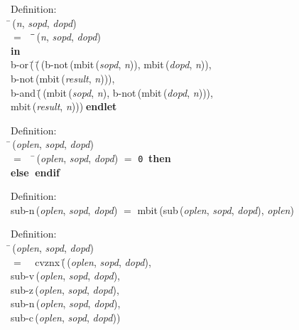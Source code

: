 \begin{tabbing}{\sc Definition}: \\  
\=\,({\it{n\/}}, {\it{sopd\/}}, {\it{dopd\/}}) \\ 
$=$$\;\;\;\;$\=\=\,({\it{n\/}}, {\it{sopd\/}}, {\it{dopd\/}})\- \\ 
{\bf in} \\ 
{\rm{b-or}}\,(\=\,(\=\,({\rm{b-not}}\,({\rm{mbit}}\,({\it{sopd\/}}, {\it{n\/}})), {\rm{mbit}}\,({\it{dopd\/}}, {\it{n\/}})), \\ 
{\rm{b-not}}\,({\rm{mbit}}\,({\it{result\/}}, {\it{n\/}})))\-, \\ 
{\rm{b-and}}\,(\=\,({\rm{mbit}}\,({\it{sopd\/}}, {\it{n\/}}), {\rm{b-not}}\,({\rm{mbit}}\,({\it{dopd\/}}, {\it{n\/}}))), \\ 
{\rm{mbit}}\,({\it{result\/}}, {\it{n\/}}))\-)\-$\;${\bf  endlet}\-\-
\end{tabbing}

\begin{tabbing}{\sc Definition}: \\  
\=\,({\it{oplen\/}}, {\it{sopd\/}}, {\it{dopd\/}}) \\ 
$=$$\;\;\;\;$\=\,({\it{oplen\/}}, {\it{sopd\/}}, {\it{dopd\/}}) $=$ {\tt{0}}$\;\;${\bf then }{} \\ 
{\bf else }{}$\;${\bf  endif}\-\-
\end{tabbing}

\begin{tabbing}{\sc Definition}: \\  
{\rm{sub-n}}\,({\it{oplen\/}}, {\it{sopd\/}}, {\it{dopd\/}}) $=$ {\rm{mbit}}\,({\rm{sub}}\,({\it{oplen\/}}, {\it{sopd\/}}, {\it{dopd\/}}), {\it{oplen\/}})
\end{tabbing}

\begin{tabbing}{\sc Definition}: \\  
\=\,({\it{oplen\/}}, {\it{sopd\/}}, {\it{dopd\/}}) \\ 
$=$$\;\;\;\;${\rm{cvznx}}\,(\=\,({\it{oplen\/}}, {\it{sopd\/}}, {\it{dopd\/}}), \\ 
{\rm{sub-v}}\,({\it{oplen\/}}, {\it{sopd\/}}, {\it{dopd\/}}), \\ 
{\rm{sub-z}}\,({\it{oplen\/}}, {\it{sopd\/}}, {\it{dopd\/}}), \\ 
{\rm{sub-n}}\,({\it{oplen\/}}, {\it{sopd\/}}, {\it{dopd\/}}), \\ 
{\rm{sub-c}}\,({\it{oplen\/}}, {\it{sopd\/}}, {\it{dopd\/}}))\-\-
\end{tabbing}

